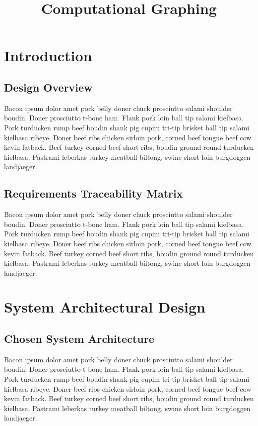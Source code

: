 \documentclass[12pt]{memoir}
\title{Computational Graphing}
\begin{document}
    \newcommand{\documentname}{Architectural Requirements Specification}        	\newcommand{\documentversion}{0.1}
    
    \newpage

	\tableofcontents

	\newpage
	
	
	\section{Introduction}
	\subsection{Design Overview}
Bacon ipsum dolor amet pork belly doner chuck prosciutto salami shoulder boudin. Doner prosciutto t-bone ham. Flank pork loin ball tip salami kielbasa. Pork turducken rump beef boudin shank pig cupim tri-tip brisket ball tip salami kielbasa ribeye. Doner beef ribs chicken sirloin pork, corned beef tongue beef cow kevin fatback. Beef turkey corned beef short ribs, boudin ground round turducken kielbasa. Pastrami leberkas turkey meatball biltong, swine short loin burgdoggen landjaeger.

	\subsection{Requirements Traceability Matrix}
Bacon ipsum dolor amet pork belly doner chuck prosciutto salami shoulder boudin. Doner prosciutto t-bone ham. Flank pork loin ball tip salami kielbasa. Pork turducken rump beef boudin shank pig cupim tri-tip brisket ball tip salami kielbasa ribeye. Doner beef ribs chicken sirloin pork, corned beef tongue beef cow kevin fatback. Beef turkey corned beef short ribs, boudin ground round turducken kielbasa. Pastrami leberkas turkey meatball biltong, swine short loin burgdoggen landjaeger.

	\newpage
	\section{System Architectural Design}
	\subsection{Chosen System Architecture}
Bacon ipsum dolor amet pork belly doner chuck prosciutto salami shoulder boudin. Doner prosciutto t-bone ham. Flank pork loin ball tip salami kielbasa. Pork turducken rump beef boudin shank pig cupim tri-tip brisket ball tip salami kielbasa ribeye. Doner beef ribs chicken sirloin pork, corned beef tongue beef cow kevin fatback. Beef turkey corned beef short ribs, boudin ground round turducken kielbasa. Pastrami leberkas turkey meatball biltong, swine short loin burgdoggen landjaeger.
\end{document}
